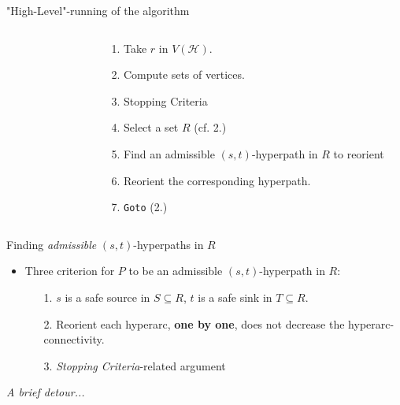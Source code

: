 \documentclass[10pt, aspectratio=43,compress]{beamer}
\begin{document}
\begin{frame}{"High-Level"-running of the algorithm}
\begin{columns}
\begin{column}{0.5\textwidth}
\begin{figure}[H]
\begin{tikzpicture}
					\end{tikzpicture}
				\end{figure}
			\end{column}
			\hfill
			\begin{column}{0.5\textwidth}
				\begin{enumerate}
					\item <alert@2> Take $r$ in $V(\mathcal{H})$.
					\item <alert@3,9,15,25> Compute sets of vertices.
					\item <alert@4,10,16,26> Stopping Criteria
					\item <alert@5,11,17> Select a set $R$ (cf. 2.)
					\item <alert@6,12,18> Find an admissible $(s, t)$-hyperpath in $R$ to reorient
					\item <alert@7,13,19-23> Reorient the corresponding hyperpath.
					\item <alert@8,14,24> \texttt{Goto} (2.)
				\end{enumerate}
			\end{column}
		\end{columns}	
	\end{frame}

	\begin{frame}{Finding \textit{admissible} $(s, t)$-hyperpaths in $R$}

		\begin{tcolorbox}[colback=darkseagreen!5!white,colframe=darkseagreen!75!black,title=Admissible hyperpaths]
			\begin{itemize}[<+->]
				\item Three criterion for $P$ to be an admissible $(s, t)$-hyperpath in $R$:
				\begin{itemize}
					\item[1.] $s$ is a {\color{alizarin}safe source} in $S\subseteq{R}$, $t$ is a {\color{alizarin}safe sink} in $T\subseteq{R}$.
					\item[2.] Reorient each hyperarc, \textbf{one by one}, does not decrease the hyperarc-connectivity.
					\item[3.] \textit{Stopping Criteria}-related argument
				\end{itemize}
			\end{itemize}
		\end{tcolorbox}

		\begin{flushright}
			\textit{A brief detour...}
		\end{flushright}
	\end{frame}
\end{document}

